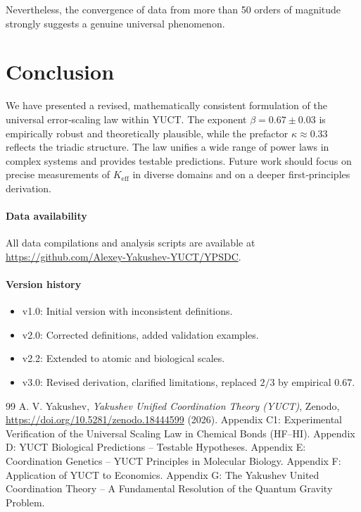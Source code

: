 \documentclass[12pt]{article}
\newcommand{\Keff}{K_{\mathrm{eff}}}
\begin{document}
	Nevertheless, the convergence of data from more than 50 orders of magnitude strongly suggests a genuine universal phenomenon.
	
	\section{Conclusion}
	We have presented a revised, mathematically consistent formulation of the universal error‑scaling law within YUCT. The exponent \(\beta = 0.67 \pm 0.03\) is empirically robust and theoretically plausible, while the prefactor \(\kappa \approx 0.33\) reflects the triadic structure. The law unifies a wide range of power laws in complex systems and provides testable predictions. Future work should focus on precise measurements of \(\Keff\) in diverse domains and on a deeper first‑principles derivation.
	
	\paragraph*{Data availability}
	All data compilations and analysis scripts are available at \url{https://github.com/Alexey-Yakushev-YUCT/YPSDC}.
	
	\paragraph*{Version history}
	\begin{itemize}
		\item v1.0: Initial version with inconsistent definitions.
		\item v2.0: Corrected definitions, added validation examples.
		\item v2.2: Extended to atomic and biological scales.
		\item v3.0: Revised derivation, clarified limitations, replaced \(2/3\) by empirical \(0.67\).
	\end{itemize}
	
	\begin{thebibliography}{99}
		A. V. Yakushev, \emph{Yakushev Unified Coordination Theory (YUCT)}, Zenodo, \url{https://doi.org/10.5281/zenodo.18444599} (2026).
		Appendix C1: Experimental Verification of the Universal Scaling Law in Chemical Bonds (HF–HI).
		Appendix D: YUCT Biological Predictions – Testable Hypotheses.
		Appendix E: Coordination Genetics – YUCT Principles in Molecular Biology.
		Appendix F: Application of YUCT to Economics.
		Appendix G: The Yakushev United Coordination Theory – A Fundamental Resolution of the Quantum Gravity Problem.
	\end{thebibliography}
	
\end{document}
